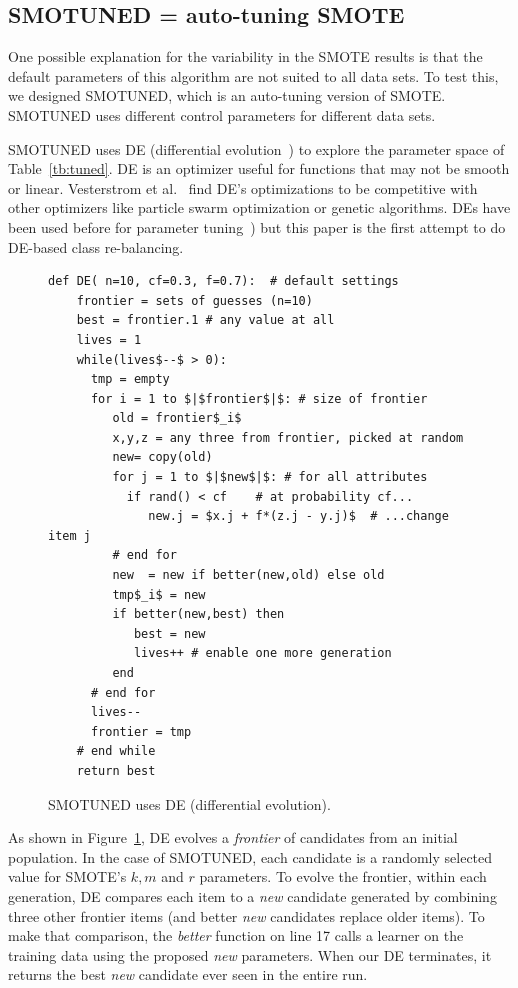 \documentclass[10pt,conference]{IEEEtran}
\theoremstyle{break}
\theoremstyle{break}
\newcommand{\sma}{{\sc SMOTE}}
\newcommand{\smb}{{\sc SMOTUNED}}
\begin{document}
\subsection{SMOTUNED = auto-tuning SMOTE}
\label{sect:smotuned}

One possible explanation for the variability in the {\sma} results is that the
default parameters of this algorithm are not suited to all data sets. To test this,
we designed {\smb}, which is an auto-tuning version of {\sma}. {\smb}
uses different control parameters for different data sets.


 
{\smb} uses DE (differential evolution~\cite{storn1997differential}) to explore the parameter space of
Table~\ref{tb:tuned}.  DE is an
optimizer useful for functions that may not be smooth or linear.  Vesterstrom et al.~\cite{Vesterstrom04} find   DE's optimizations to be  competitive with other optimizers like 
   particle swarm optimization or genetic algorithms.
   DEs have been used before for   parameter tuning~\cite{omran2005differential, chiha2012tuning,fu2016tuning,fu2017easy, agrawal2016wrong}) but this paper is  the first attempt to do
   DE-based class re-balancing.

\begin{figure}[!b]
\scriptsize
\begin{lstlisting}[mathescape,linewidth=8.2cm,frame=r,numbers=right]
  def DE( n=10, cf=0.3, f=0.7):  # default settings
    frontier = sets of guesses (n=10)
    best = frontier.1 # any value at all
    lives = 1
    while(lives$--$ > 0): 
      tmp = empty
      for i = 1 to $|$frontier$|$: # size of frontier
         old = frontier$_i$
         x,y,z = any three from frontier, picked at random
         new= copy(old)  
         for j = 1 to $|$new$|$: # for all attributes
           if rand() < cf    # at probability cf...
              new.j = $x.j + f*(z.j - y.j)$  # ...change item j
         # end for
         new  = new if better(new,old) else old
         tmp$_i$ = new 
         if better(new,best) then
            best = new
            lives++ # enable one more generation
         end                  
      # end for
      lives--
      frontier = tmp
    # end while
    return best
\end{lstlisting}
\caption{SMOTUNED uses DE (differential evolution).}
\label{fig:pseudo_DE}  
\end{figure}


As shown in Figure~\ref{fig:pseudo_DE}, DE evolves a \textit{frontier} of
candidates from an initial population. In the case of {\smb},
each  candidate is a randomly selected value for SMOTE's $k, m$ and $r$ parameters.
 To evolve the frontier, within each generation,
 DE compares each item to a {\em new} candidate generated
 by combining three other frontier items (and better {\em new} candidates replace
 older items). 
 To make that comparison, the {\em better} function on line 17 calls a learner on the training data using the proposed {\em new} parameters.
 When our DE  terminates, it returns the best {\em new} candidate ever seen in the entire run.
 
\end{document}
